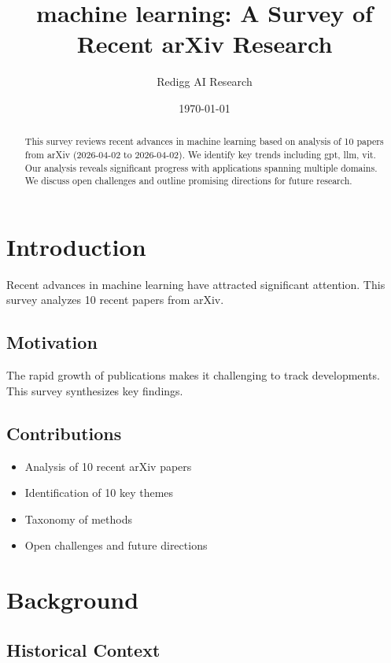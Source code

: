 \documentclass[11pt,a4paper]{article}
\title{machine learning: A Survey of Recent arXiv Research}
\author{Redigg AI Research}
\date{\today}
\begin{document}
\maketitle

\begin{abstract}
This survey reviews recent advances in machine learning based on analysis of 10 papers from arXiv (2026-04-02 to 2026-04-02). We identify key trends including gpt, llm, vit. Our analysis reveals significant progress with applications spanning multiple domains. We discuss open challenges and outline promising directions for future research.
\end{abstract}


\section{Introduction}

Recent advances in machine learning have attracted significant attention. This survey analyzes 10 recent papers from arXiv.

\subsection{Motivation}

The rapid growth of publications makes it challenging to track developments. This survey synthesizes key findings.

\subsection{Contributions}

\begin{itemize}
    \item Analysis of 10 recent arXiv papers
    \item Identification of 10 key themes
    \item Taxonomy of methods
    \item Open challenges and future directions
\end{itemize}



\section{Background}

\subsection{Historical Context}
\end{document}
